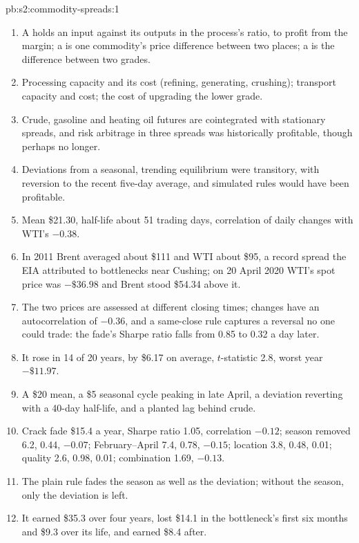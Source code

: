 \begin{solution}{pb:s2:commodity-spreads:1}
\begin{enumerate}
\item A  holds an input against its outputs in the process's ratio, to profit from the margin; a  is one
commodity's price difference between two places; a  is the difference between two grades.
\item Processing capacity and its cost (refining, generating, crushing); transport capacity and cost; the cost of upgrading the lower grade.
\item Crude, gasoline and heating oil futures are cointegrated with stationary spreads, and risk arbitrage in three spreads was historically
profitable, though perhaps no longer.
\item Deviations from a seasonal, trending equilibrium were transitory, with reversion to the recent five-day average, and simulated rules would have
been profitable.
\item Mean \$21.30, half-life about 51 trading days, correlation of daily changes with WTI's $-0.38$.
\item In 2011 Brent averaged about \$111 and WTI about \$95, a record spread the EIA attributed to bottlenecks near Cushing; on 20 April 2020 WTI's
spot price was $-\$36.98$ and Brent stood \$54.34 above it.
\item The two prices are assessed at different closing times; changes have an autocorrelation of $-0.36$, and a same-close rule captures a reversal no
one could trade: the fade's Sharpe ratio falls from 0.85 to 0.32 a day later.
\item It rose in 14 of 20 years, by \$6.17 on average, $t$-statistic 2.8, worst year $-\$11.97$.
\item A \$20 mean, a \$5 seasonal cycle peaking in late April, a deviation reverting with a 40-day half-life, and a planted lag behind crude.
\item Crack fade \$15.4 a year, Sharpe ratio 1.05, correlation $-0.12$; season removed 6.2, 0.44, $-0.07$; February--April 7.4, 0.78, $-0.15$;
location 3.8, 0.48, 0.01; quality 2.6, 0.98, 0.01; combination 1.69, $-0.13$.
\item The plain rule fades the season as well as the deviation; without the season, only the deviation is left.
\item It earned \$35.3 over four years, lost \$14.1 in the bottleneck's first six months and \$9.3 over its life, and earned \$8.4 after.

\end{enumerate}
\end{solution}
